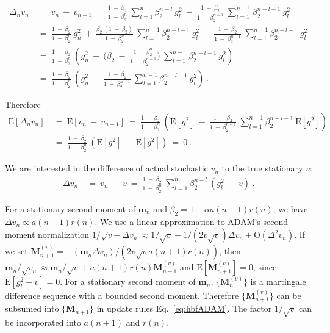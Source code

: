 \documentclass{article}
\newcommand\Bm{\bm{m}}
\newcommand\BM{\bm{M}}
\newcommand{\rE}{\mathrm{E}} \newcommand{\rF}{\mathrm{F}}
\newcommand{\rO}{\mathrm{O}} \newcommand{\rP}{\mathrm{P}}
\begin{document}
\begin{align}
\Delta_n v_n \ &= \  v_n \ - \ v_{n-1} \ = \
\frac{1 \ - \ \beta_2}{1 \ - \ \beta_2^n} \
\sum_{l=1}^{n} \beta_2^{n-l} \ g_l^2 \ - \
\frac{1 \ - \ \beta_2}{1 \ - \ \beta_2^{n-1}} \
\sum_{l=1}^{n-1} \beta_2^{n-l-1} \ g_l^2 \\ \nonumber
&= \ \frac{1 \ - \ \beta_2}{1 \ - \ \beta_2^n} \  g_n^2 \ + \
\frac{\beta_2 \ (1 \ - \ \beta_2)}{1 \ - \ \beta_2^n} \
\sum_{l=1}^{n-1} \beta_2^{n-l-1} \ g_l^2 \ - \
\frac{1 \ - \ \beta_2}{1 \ - \ \beta_2^{n-1}} \
\sum_{l=1}^{n-1} \beta_2^{n-l-1} \ g_l^2 \\ \nonumber
&= \ \frac{1 \ - \ \beta_2}{1 \ - \ \beta_2^n} \  \left( g_n^2 \ + \
\big(\beta_2 \ - \  \frac{1 \ - \ \beta_2^n}{1 \ - \ \beta_2^{n-1}}
\big)  \ \sum_{l=1}^{n-1} \beta_2^{n-l-1} \ g_l^2 \right) \\ \nonumber
&= \ \frac{1 \ - \ \beta_2}{1 \ - \ \beta_2^n} \  \left( g_n^2 \ - \
 \frac{1 \ - \ \beta_2}{1 \ - \ \beta_2^{n-1}} \  \sum_{l=1}^{n-1}
  \beta_2^{n-l-1} \ g_l^2 \right) \ .
\end{align}


Therefore
\begin{align}
\rE \left[\Delta_n v_n \right] \ &= \ \rE \left[ v_n \ - \ v_{n-1} \right] \ = \
 \frac{1 \ - \ \beta_2}{1 \ - \ \beta_2^n} \  \left( \rE \left[g^2\right] \ - \
 \frac{1 \ - \ \beta_2}{1 \ - \ \beta_2^{n-1}} \  \sum_{l=1}^{n-1}
  \beta_2^{n-l-1} \ \rE \left[g^2\right] \right) \\ \nonumber
&= \  \frac{1 \ - \ \beta_2}{1 \ - \ \beta_2^n} \
\left( \rE \left[g^2\right] \ - \  \rE \left[g^2\right]  \right)
\ = \ 0 \ .
\end{align}


We are interested in the difference of actual stochastic $v_n$ to the
true stationary $v$:
\begin{align}
\Delta v_n \ &= \  v_n \ - \ v \ = \
\frac{1 \ - \ \beta_2}{1 \ - \ \beta_2^n} \  \sum_{l=1}^{n}
        \beta_2^{n-l} \ \left( g_l^2 \ - \ v \right) \ .
\end{align}

For a stationary second moment of $\Bm_n$ and $\beta_2=1-\alpha a(n+1)r(n)$, we have
$\Delta v_n \propto a(n+1)r(n)$.
We use a linear approximation to ADAM's second moment normalization
$1/\sqrt{v+\Delta v_n} \approx 1/\sqrt{v} - 1/(2 v \sqrt{v})  \Delta v_n
+ \rO(\Delta^2 v_n)$.
If we set $\BM_{n+1}^{(v)}=- (\Bm_n \Delta v_n)/(2 v
\sqrt{v}a(n+1)r(n))$, then $\Bm_n / \sqrt{v_n} \approx \Bm_n / \sqrt{v} +
a(n+1)r(n)\BM_{n+1}^{(v)}$ and
$\rE \left[\BM_{n+1}^{(v)} \right] = 0$, since $\rE \left[g_l^2 - v \right] = 0$.
For a stationary second moment of $\Bm_n$, $\{\BM^{(v)}_n\}$ is a martingale
difference sequence with a bounded second moment.
Therefore $\{\BM^{(v)}_{n+1}\}$ can be subsumed into  $\{\BM_{n+1}\}$ in update
rules Eq.~\eqref{eq:hbfADAM}. The factor $1 / \sqrt{v}$ can be
incorporated into $a(n+1)$ and $r(n)$.
\end{document}
